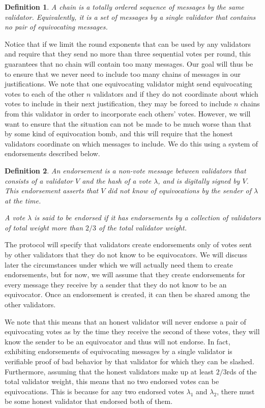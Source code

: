 \documentclass[12pt, fleqn]{article}
\newtheorem{definition}{Definition}
\begin{document}
\begin{definition}
A \emph{chain} is a totally ordered sequence of messages by the same validator. Equivalently, it is a set of messages by a single validator that contains no pair of equivocating messages.
\end{definition}

Notice that if we limit the round exponents that can be used by any validators and require that they send no more than three sequential votes per round, this guarantees that no chain will contain too many messages. Our goal will thus be to ensure that we never need to include too many chains of messages in our justifications. We note that one equivocating validator might send equivocating votes to each of the other $n$ validators and if they do not coordinate about which votes to include in their next justification, they may be forced to include $n$ chains from this validator in order to incorporate each others' votes. However, we will want to ensure that the situation can not be made to be much worse than that by some kind of equivocation bomb, and this will require that the honest validators coordinate on which messages to include. We do this using a system of endorsements described below.

\begin{definition}
An \emph{endorsement} is a non-vote message between validators that consists of a validator $V$ and the hash of a vote $\lambda$, and is digitally signed by $V$. This endorsement asserts that $V$ did not know of equivocations by the sender of $\lambda$ at the time.

A vote $\lambda$ is said to be \emph{endorsed} if it has endorsements by a collection of validators of total weight more than $2/3$ of the total validator weight.
\end{definition}

The protocol will specify that validators create endorsements only of votes sent by other validators that they do not know to be equivocators. We will discuss later the circumstances under which we will actually need them to create endorsements, but for now, we will assume that they create endorsements for every message they receive by a sender that they do not know to be an equivocator. Once an endorsement is created, it can then be shared among the other validators.

We note that this means that an honest validator will never endorse a pair of equivocating votes as by the time they receive the second of these votes, they will know the sender to be an equivocator and thus will not endorse. In fact, exhibiting endorsements of equivocating messages by a single validator is verifiable proof of bad behavior by that validator for which they can be slashed. Furthermore, assuming that the honest validators make up at least $2/3$rds of the total validator weight, this means that no two endorsed votes can be equivocations. This is because for any two endorsed votes $\lambda_1$ and $\lambda_2$, there must be some honest validator that endorsed both of them.
\end{document}
